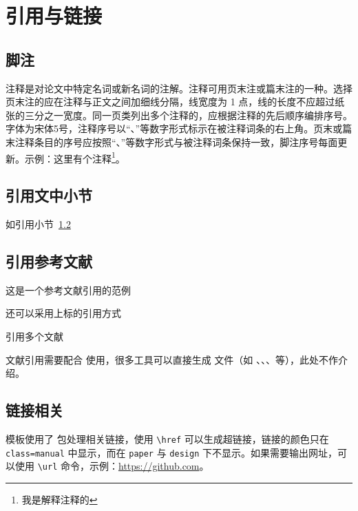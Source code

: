 
\chapter{引用与链接}

\section{脚注}
注释是对论文中特定名词或新名词的注解。注释可用页末注或篇末注的一种。选择页末注的应在注释与正文之间加细线分隔，线宽度为 1 点，线的长度不应超过纸张的三分之一宽度。同一页类列出多个注释的，应根据注释的先后顺序编排序号。字体为宋体5号，注释序号以“、”等数字形式标示在被注释词条的右上角。页末或篇末注释条目的序号应按照“、”等数字形式与被注释词条保持一致，脚注序号每面更新。示例：这里有个注释\footnote{我是解释注释的}。

\section{引用文中小节}\label{sec:ref}
如引用小节~\ref{sec:ref}

\section{引用参考文献}
这是一个参考文献引用的范例\cite{kuhn2004man}

还可以采用上标的引用方式

引用多个文献\cite{kuhn2004man,江泽民2008新时期我国信息技术产业的发展,江泽民1989能源发展趋势及主要节能措施}

文献引用需要配合  使用，很多工具可以直接生成  文件（如 、、、等），此处不作介绍。

\section{链接相关}
模板使用了  包处理相关链接，使用 \verb|\href| 可以生成超链接，链接的颜色只在 \verb|class=manual| 中显示，而在 \verb|paper| 与 \verb|design| 下不显示。如果需要输出网址，可以使用 \verb|\url| 命令，示例：\url{https://github.com}。